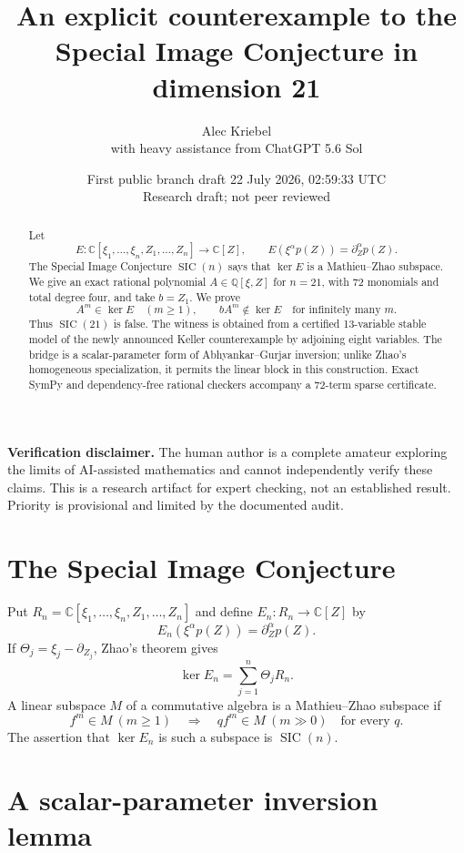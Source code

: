 \documentclass[11pt]{article}
\title{An explicit counterexample to the\\Special Image Conjecture in dimension 21}
\author{Alec Kriebel\\[2pt]\large with heavy assistance from ChatGPT 5.6 Sol}
\date{First public branch draft 22 July 2026, 02:59:33 UTC\\
Research draft; not peer reviewed}
\newcommand{\C}{\mathbb C}
\newcommand{\Q}{\mathbb Q}
\newcommand{\SIC}{\operatorname{SIC}}
\begin{document}
\maketitle

\begin{abstract}
Let
\[
 E:\C[\xi_1,\ldots,\xi_n,Z_1,\ldots,Z_n]\longrightarrow\C[Z],
 \qquad E(\xi^\alpha p(Z))=\partial_Z^\alpha p(Z).
\]
The Special Image Conjecture $\SIC(n)$ says that $\ker E$ is a
Mathieu--Zhao subspace. We give an exact rational polynomial
$A\in\Q[\xi,Z]$ for $n=21$, with 72 monomials and total degree four,
and take $b=Z_1$. We prove
\[
 A^m\in\ker E\quad(m\geq1),\qquad
 bA^m\notin\ker E\quad\text{for infinitely many }m.
\]
Thus $\SIC(21)$ is false. The witness is obtained from a certified
13-variable stable model of the newly announced Keller counterexample by
adjoining eight variables. The bridge is a scalar-parameter form of
Abhyankar--Gurjar inversion; unlike Zhao's homogeneous specialization, it
permits the linear block in this construction. Exact SymPy and
dependency-free rational checkers accompany a 72-term sparse certificate.
\end{abstract}

\noindent\textbf{Verification disclaimer.}
The human author is a complete amateur exploring the limits of AI-assisted
mathematics and cannot independently verify these claims. This is a research
artifact for expert checking, not an established result. Priority is
provisional and limited by the documented audit.

\section{The Special Image Conjecture}

Put $R_n=\C[\xi_1,\ldots,\xi_n,Z_1,\ldots,Z_n]$ and define
$E_n:R_n\to\C[Z]$ by
\[
 E_n(\xi^\alpha p(Z))=\partial_Z^\alpha p(Z).
\]
If $\Theta_j=\xi_j-\partial_{Z_j}$, Zhao's theorem gives
\begin{equation}
 \ker E_n=\sum_{j=1}^n\Theta_jR_n. \label{eq:kernel}
\end{equation}
A linear subspace $M$ of a commutative algebra is a Mathieu--Zhao subspace if
\[
 f^m\in M\ (m\geq1)
 \quad\Longrightarrow\quad
 qf^m\in M\ (m\gg0)\quad\text{for every }q.
\]
The assertion that $\ker E_n$ is such a subspace is $\SIC(n)$.

\section{A scalar-parameter inversion lemma}
\end{document}
